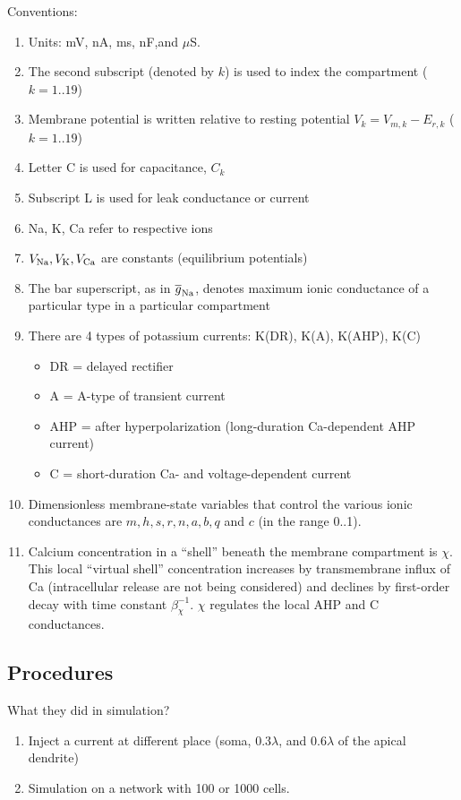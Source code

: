 Conventions:
\begin{enumerate}
\item Units: mV, nA, ms, nF,and $\mu$S.
\item The second subscript (denoted by $k$) is used to index the
  compartment ($k=1..19$)
\item Membrane potential is written relative to resting potential
  $V_k=V_{m,k}-E_{r,k}$ ($k=1..19$)
\item Letter C is used for capacitance, $C_k$
\item Subscript L is used for leak conductance or current
\item Na, K, Ca refer to respective ions
\item $V_{\ce{Na}}, V_{\ce{K}}, V_{\ce{Ca}}$ are constants (equilibrium
  potentials) 
\item The bar superscript, as in $\overline{g}_{\ce{Na}}$, denotes maximum
  ionic conductance of a particular type in a particular compartment
\item There are 4 types of potassium currents: K(DR), K(A), K(AHP),
  K(C)
  \begin{itemize}
  \item DR = delayed rectifier
  \item A = A-type of transient current
  \item AHP = after hyperpolarization (long-duration Ca-dependent AHP
    current) 
  \item C = short-duration Ca- and voltage-dependent current
  \end{itemize}
\item Dimensionless membrane-state variables that control the various
  ionic conductances are $m,h,s,r,n,a,b,q$ and $c$ (in the range
  0..1).
\item Calcium concentration in a ``shell'' beneath the membrane
  compartment is $\chi$. This local ``virtual shell'' concentration
  increases by transmembrane influx of Ca (intracellular release are
  not being considered) and declines by first-order decay with time
  constant $\beta_\chi^{-1}$. $\chi$ regulates the local AHP and C
  conductances.
\end{enumerate}

\subsection{Procedures}
\label{sec:procedures}


What they did in simulation?
\begin{enumerate}
\item Inject a current at different place (soma, $0.3\lambda$,
  and $0.6\lambda$ of the apical dendrite)
\item Simulation on a network with 100 or 1000 cells.
\end{enumerate}

